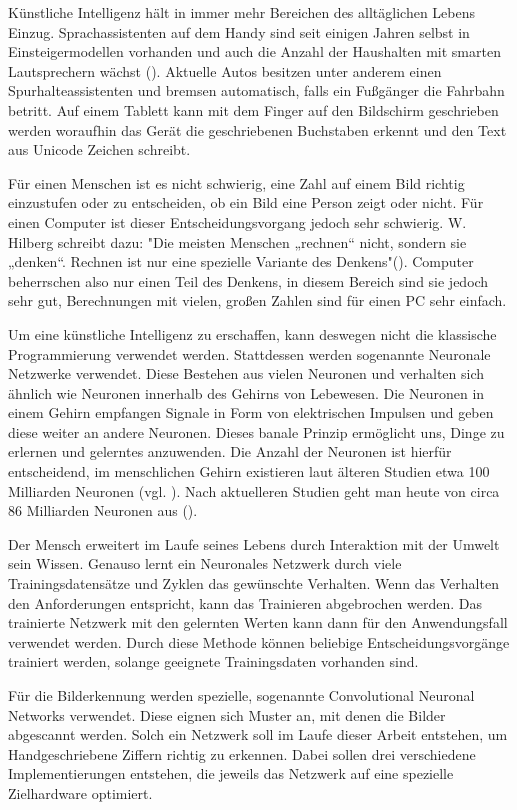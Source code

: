 \documentclass[../main.tex]{subfiles}
\begin{document}
Künstliche Intelligenz hält in immer mehr Bereichen des alltäglichen Lebens Einzug. Sprachassistenten auf dem Handy sind seit einigen Jahren selbst in Einsteigermodellen vorhanden und auch die Anzahl der Haushalten mit smarten Lautsprechern wächst (\cite{statisticSprachassistenten}). Aktuelle Autos besitzen unter anderem einen Spurhalteassistenten und bremsen automatisch, falls ein Fußgänger die Fahrbahn betritt. Auf einem Tablett kann mit dem Finger auf den Bildschirm geschrieben werden woraufhin das Gerät die geschriebenen Buchstaben erkennt und den Text aus Unicode Zeichen schreibt.

Für einen Menschen ist es nicht schwierig, eine Zahl auf einem Bild richtig einzustufen oder zu entscheiden, ob ein Bild eine Person zeigt oder nicht. Für einen Computer ist dieser Entscheidungsvorgang jedoch sehr schwierig. {W. Hilberg} schreibt dazu: "Die meisten Menschen „rechnen“ nicht, sondern sie „denken“. Rechnen ist nur eine spezielle Variante des Denkens"(\cite{articleKuenstlichesGehirn}). Computer beherrschen also nur einen Teil des Denkens, in diesem Bereich sind sie jedoch sehr gut, Berechnungen mit vielen, großen Zahlen sind für einen PC sehr einfach. 

Um eine künstliche Intelligenz zu erschaffen, kann deswegen nicht die klassische Programmierung verwendet werden. Stattdessen werden sogenannte Neuronale Netzwerke verwendet. Diese Bestehen aus vielen Neuronen und verhalten sich ähnlich wie Neuronen innerhalb des Gehirns von Lebewesen. 
Die Neuronen in einem Gehirn empfangen Signale in Form von elektrischen Impulsen und geben diese weiter an andere Neuronen. Dieses banale Prinzip ermöglicht uns, Dinge zu erlernen und gelerntes anzuwenden. Die Anzahl der Neuronen ist hierfür entscheidend, im menschlichen Gehirn existieren laut älteren Studien etwa 100 Milliarden Neuronen (vgl. \cite{articleKuenstlichesGehirn}). Nach aktuelleren Studien geht man heute von circa 86 Milliarden Neuronen aus (\cite{articleWieVieleNervenzellenHatDasGehirn}).

Der Mensch erweitert im Laufe seines Lebens durch Interaktion mit der Umwelt sein Wissen. Genauso lernt ein Neuronales Netzwerk durch viele Trainingsdatensätze und Zyklen das gewünschte Verhalten. Wenn das Verhalten den Anforderungen entspricht, kann das Trainieren abgebrochen werden. Das trainierte Netzwerk mit den gelernten Werten kann dann für den Anwendungsfall verwendet werden. Durch diese Methode können beliebige Entscheidungsvorgänge trainiert werden, solange geeignete Trainingsdaten vorhanden sind.

Für die Bilderkennung werden spezielle, sogenannte {Convolutional Neuronal Networks} verwendet. Diese eignen sich Muster an, mit denen die Bilder abgescannt werden. Solch ein Netzwerk soll im Laufe dieser Arbeit entstehen, um Handgeschriebene Ziffern richtig zu erkennen. Dabei sollen drei verschiedene Implementierungen entstehen, die jeweils das Netzwerk auf eine spezielle Zielhardware optimiert.
\end{document}
